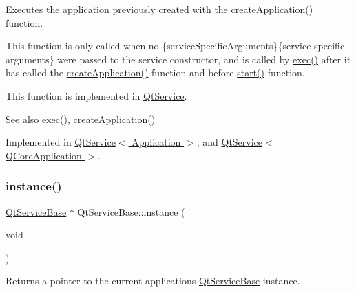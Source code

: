 Executes the application previously created with the \hyperlink{class_qt_service_base_ac5ae73935f489282b35c70b27b341390}{create\+Application()} function.

This function is only called when no  \{service\+Specific\+Arguments\}\{service specific arguments\} were passed to the service constructor, and is called by \hyperlink{class_qt_service_base_afae2e589de71c1ae3ae8db3dc9ab9c64}{exec()} after it has called the \hyperlink{class_qt_service_base_ac5ae73935f489282b35c70b27b341390}{create\+Application()} function and before \hyperlink{class_qt_service_base_adbc0cd621b41bd3a6a1f62fda432e9e4}{start()} function.

This function is implemented in \hyperlink{class_qt_service}{Qt\+Service}.

\begin{DoxySeeAlso}{See also}
\hyperlink{class_qt_service_base_afae2e589de71c1ae3ae8db3dc9ab9c64}{exec()}, \hyperlink{class_qt_service_base_ac5ae73935f489282b35c70b27b341390}{create\+Application()} 
\end{DoxySeeAlso}


Implemented in \hyperlink{class_qt_service_a84f5f60304117e1f11cc0ed16dc0b72e}{Qt\+Service$<$ Application $>$}, and \hyperlink{class_qt_service_a84f5f60304117e1f11cc0ed16dc0b72e}{Qt\+Service$<$ Q\+Core\+Application $>$}.

\mbox{\label{class_qt_service_base_a8f030376e32cc47736bfc1a1e1ecf855}} 
\subsubsection{\texorpdfstring{instance()}{instance()}}
{\footnotesize\ttfamily \hyperlink{class_qt_service_base}{Qt\+Service\+Base} $\ast$ Qt\+Service\+Base\+::instance (\begin{DoxyParamCaption}\item[{void}]{ }\end{DoxyParamCaption})\hspace{0.3cm}{\ttfamily [static]}}

Returns a pointer to the current application\textquotesingle{}s \hyperlink{class_qt_service_base}{Qt\+Service\+Base} instance. \mbox{\label{class_qt_service_base_ac071ce0b30547e17c3b3ca9dcb0108c9}} 
